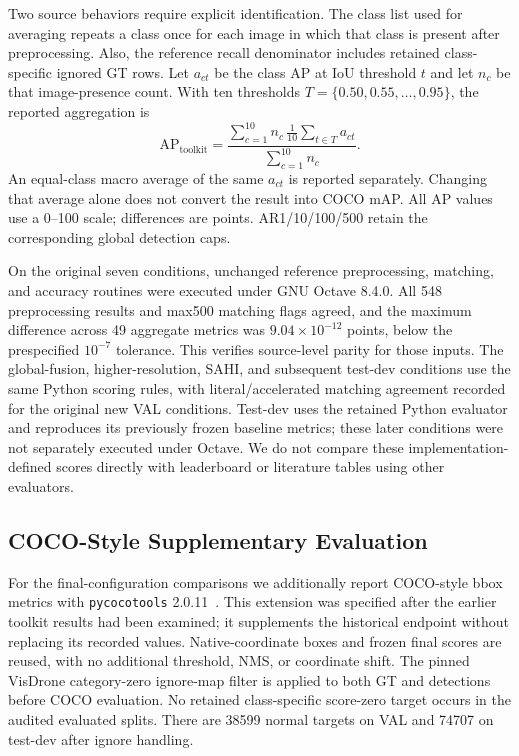 \documentclass[journal]{IEEEtran}
\newcommand{\APlit}{\mathrm{AP}_{\mathrm{toolkit}}}
\begin{document}
Two source behaviors require explicit identification. The class list used for averaging repeats a class once for each image in which that class is present after preprocessing. Also, the reference recall denominator includes retained class-specific ignored GT rows. Let $a_{ct}$ be the class AP at IoU threshold $t$ and let $n_c$ be that image-presence count. With ten thresholds $T=\{0.50,0.55,\ldots,0.95\}$, the reported aggregation is
\begin{equation}
\APlit=\frac{\sum_{c=1}^{10} n_c\,\frac1{10}\sum_{t\in T}a_{ct}}
                   {\sum_{c=1}^{10}n_c}.
\label{eq:metric}
\end{equation}
An equal-class macro average of the same $a_{ct}$ is reported separately. Changing that average alone does not convert the result into COCO mAP. All AP values use a 0--100 scale; differences are points. AR1/10/100/500 retain the corresponding global detection caps.

On the original seven conditions, unchanged reference preprocessing, matching, and accuracy routines were executed under GNU Octave 8.4.0. All 548 preprocessing results and max500 matching flags agreed, and the maximum difference across 49 aggregate metrics was $9.04\times10^{-12}$ points, below the prespecified $10^{-7}$ tolerance. This verifies source-level parity for those inputs. The global-fusion, higher-resolution, SAHI, and subsequent test-dev conditions use the same Python scoring rules, with literal/accelerated matching agreement recorded for the original new VAL conditions. Test-dev uses the retained Python evaluator and reproduces its previously frozen baseline metrics; these later conditions were not separately executed under Octave. We do not compare these implementation-defined scores directly with leaderboard or literature tables using other evaluators.

\subsection{COCO-Style Supplementary Evaluation}
For the final-configuration comparisons we additionally report COCO-style bbox metrics with \texttt{pycocotools} 2.0.11~\cite{lin2014coco}. This extension was specified after the earlier toolkit results had been examined; it supplements the historical endpoint without replacing its recorded values. Native-coordinate boxes and frozen final scores are reused, with no additional threshold, NMS, or coordinate shift. The pinned VisDrone category-zero ignore-map filter is applied to both GT and detections before COCO evaluation. No retained class-specific score-zero target occurs in the audited evaluated splits. There are 38599 normal targets on VAL and 74707 on test-dev after ignore handling.
\end{document}
